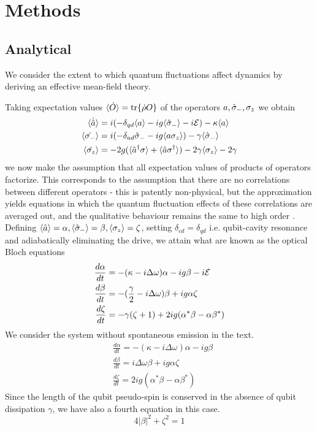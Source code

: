 \section{Methods}
\subsection{Analytical}
We consider the extent to which quantum fluctuations affect dynamics by deriving an effective mean-field theory.

Taking expectation values $\langle \dot{O} \rangle = \tr\{\dot{\rho} O \}$ of the operators $a, \hat{\sigma}_-, \sigma_z$ we obtain
\begin{align}
  \langle \dot{\hat{a}} \rangle & = i(-\delta_{qd}\langle a \rangle - ig \langle \hat{\sigma}_- \rangle -i\mathcal{E}) -\kappa \langle a \rangle \\
  \langle \dot{\sigma_-} \rangle & = i(-\delta_{ad}\hat{\sigma}_- - ig \langle a \sigma_z \rangle) - \gamma \langle \hat{\sigma}_- \rangle \\
  \langle \dot{\sigma_z} \rangle & = -2g ( \langle \hat{a}^\dagger \sigma \rangle + \langle \hat{a} \sigma^\dagger \rangle) - 2 \gamma \langle \sigma_z \rangle - 2 \gamma
\end{align}
we now make the assumption that all expectation values of products of operators factorize. This corresponds to the assumption that there are no correlations between different operators - this is patently non-physical, but the approximation yields equations in which the quantum fluctuation effects of these correlations are averaged out, and the qualitative behaviour remains the same to high order \cite{Jaynes1963a}. Defining $\langle \hat{a} \rangle = \alpha, \langle \hat{\sigma}_- \rangle = \beta, \langle
\sigma_z \rangle = \zeta$, setting $\delta_{cd} = \delta_{qd}$ i.e. qubit-cavity resonance and adiabatically eliminating the drive, we attain what are known as the optical Bloch equations
\begin{align}
  \label{sc_with_gamma}
  \frac{d \alpha}{dt} &= -(\kappa - i \Delta \omega)\alpha - ig \beta - i\mathcal{E}\\
  \frac{d \beta}{dt} &= -(\frac{\gamma}{2}-i\Delta\omega)\beta+ig\alpha\zeta \\
  \frac{d\zeta}{dt} &= -\gamma (\zeta +1)+2ig(\alpha^*\beta-\alpha\beta^*) 
\end{align}
We consider the system without spontaneous emission in the text.
\begin{align}
  \label{sc_without_gamma}
  &\frac{d \alpha}{dt} = -(\kappa -i \Delta \omega) \alpha-ig \beta \\
  &\frac{d \beta}{dt} = i \Delta \omega \beta +ig \alpha \zeta \\
  &\frac{d \zeta}{dt} = 2 i g(\alpha^* \beta -\alpha \beta^*)
\end{align}
Since the length of the qubit pseudo-spin is conserved in the absence of qubit dissipation $\gamma$, we have also a fourth equation in this case.
\begin{equation}
  4|\beta|^2+\zeta^2 = 1 
\end{equation}
